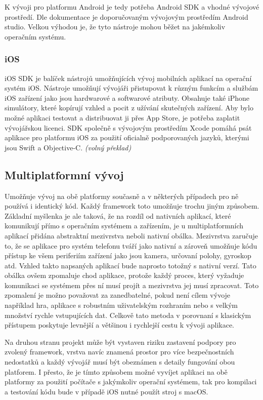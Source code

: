\documentclass[
  biblatex,
  glossaries,
  index
]{kidiplom}
\begin{document}
K vývoji pro platformu Android je tedy potřeba Android SDK a vhodné vývojové prostředí. Dle dokumentace je doporučovaným vývojovým prostředím Android studio. Velkou výhodou je, že tyto nástroje mohou běžet na jakémkoliv operačním systému.

\subsubsection{iOS}
iOS SDK je balíček nástrojů umožňujících vývoj mobilních aplikací na operační systém iOS. Nástroje umožňují vývojáři přistupovat k různým funkcím a službám iOS zařízení jako jsou hardwarové a softwarové atributy. Obsahuje také iPhone simulátory, které kopírují vzhled a pocit z užívání skutečných zařízení. Aby bylo možné aplikaci testovat a distribuovat ji přes App Store, je potřeba zaplatit vývojářskou licenci. SDK společně s vývojovým prostředím Xcode pomáhá psát aplikace pro platformu iOS za použití oficialně podporovaných  jazyků, kterými jsou Swift a Objective-C. 
\cite{2}
\textit{(volný překlad)}

\subsection{Multiplatformní vývoj}
Umožňuje vývoj na obě platformy současně a v některých případech pro ně používá i identický kód. Každý framework toto umožňuje trochu jiným způsobem. Základní myšlenka je ale taková, že na rozdíl od nativních aplikací, které komunikují přímo s operačním systémem a zařízením, je u multiplatformních aplikací přidána abstraktní mezivrstva neboli nativní obálka. Mezivrstva zaručuje to, že se aplikace pro systém telefonu tváří jako nativní a zároveň umožňuje kódu přístup ke všem periferiím zařízení jako jsou kamera, určovaní polohy, gyroskop atd. Vzhled takto napsaných aplikací bude naprosto totožný s nativní verzí. Tato obálka ovšem zpomaluje chod aplikace, protože každý proces, který vyžaduje komunikaci se systémem přes ní musí projít a mezivrstva jej musí zpracovat. Toto zpomalení je možno považovat za zanedbatelné, pokud není cílem vývoje například hra, aplikace s robustním uživatelským rozhraním nebo s velkým množství rychle vstupujících dat. Celkově tato metoda v porovnaní s klasickým přístupem poskytuje levnější a většinou i rychlejší cestu k vývoji aplikace. 

Na druhou stranu projekt může být vystaven riziku zastavení podpory pro zvolený framework, vrstva navíc znamená prostor pro více bezpečnostních nedostatků a každý vývojář musí být obeznámen s detaily fungování obou platforem. I přesto, že je tímto způsobem možné vyvíjet aplikaci na obě platformy za použití počítače s jakýmkoliv operační systémem, tak pro kompilaci a testování kódu bude v případě iOS nutné použít stroj s macOS. 
\end{document}
